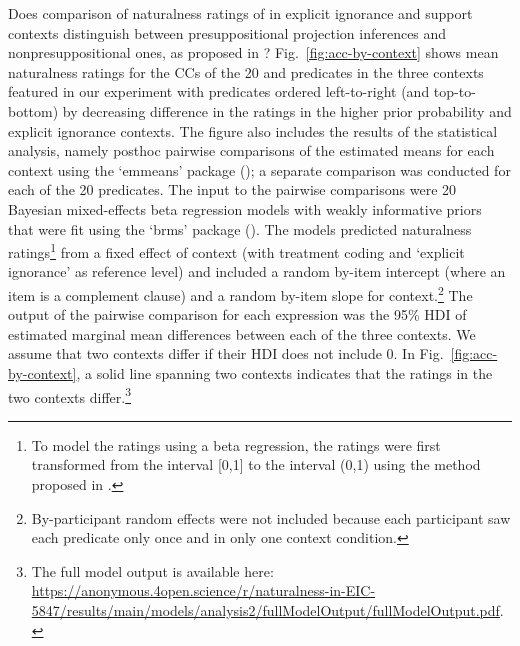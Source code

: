 \documentclass[11pt,fleqn]{article}
\newcommand{\6}{\mbox{$[\hspace*{-.6mm}[$}}
\newcommand{\9}{\mbox{$]\hspace*{-.6mm}]$}}
\begin{document}
Does comparison of naturalness ratings of in explicit ignorance and support contexts distinguish between presuppositional projection inferences and nonpresuppositional ones, as proposed in \citealt{mandelkern-etal2020}? Fig.~\ref{fig:acc-by-context} shows mean naturalness ratings for the CCs of the 20  and  predicates in the three contexts featured in our experiment with predicates ordered left-to-right (and top-to-bottom) by decreasing difference in the ratings in the higher prior probability and explicit ignorance contexts. The figure also includes the results of the statistical analysis, namely posthoc pairwise comparisons of the estimated means for each context using the `emmeans' package (\citealt{emmeans}); a separate comparison was conducted for each of the 20 predicates. The input to the pairwise comparisons were 20 Bayesian mixed-effects beta regression models with weakly informative priors that were fit using the `brms' package (\citealt{buerkner2017}). The models predicted  naturalness ratings\footnote{\label{fn:transform}To model the ratings using a beta regression, the ratings were first transformed from the interval [0,1] to the interval (0,1) using the method proposed in \citealt{smithson-verkuilen2006}.} from a fixed effect of context (with treatment coding and `explicit ignorance' as reference level) and included a random by-item intercept (where an item is a complement clause) and a random by-item slope for context.\footnote{By-participant random effects were not included because each participant saw each predicate only once and in only one context condition.} The output of the pairwise comparison for each expression was the 95\% HDI of estimated marginal mean differences between each of the three contexts. We assume that two contexts differ if their HDI does not include 0. In Fig.~\ref{fig:acc-by-context}, a solid line spanning two contexts indicates that the ratings in the two contexts differ.\footnote{The full model output is available here: \url{https://anonymous.4open.science/r/naturalness-in-EIC-5847/results/main/models/analysis2/fullModelOutput/fullModelOutput.pdf}.} 
\end{document}
